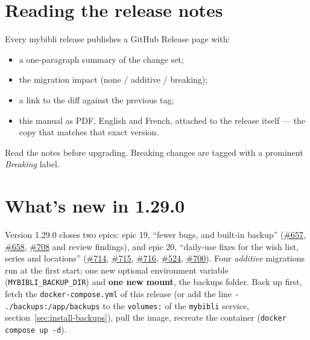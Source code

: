 \section{Reading the release notes}

Every mybibli release publishes a GitHub Release page with:

\begin{itemize}
  \item a one-paragraph summary of the change set;
  \item the migration impact (none / additive / breaking);
  \item a link to the diff against the previous tag;
  \item this manual as PDF, English and French, attached to the
        release itself --- the copy that matches that exact version.
\end{itemize}

Read the notes before upgrading. Breaking changes are tagged with a
prominent \emph{Breaking} label.

\section{What's new in 1.29.0}\label{sec:whats-new-1.29.0}

Version 1.29.0 closes two epics: epic 19, ``fewer bugs, and built-in
backup'' (\href{https://github.com/guycorbaz/mybibli/issues/657}{\#657},
\href{https://github.com/guycorbaz/mybibli/issues/658}{\#658},
\href{https://github.com/guycorbaz/mybibli/issues/708}{\#708} and
review findings), and epic 20, ``daily-use fixes for the wish list, series and locations''
(\href{https://github.com/guycorbaz/mybibli/issues/714}{\#714},
\href{https://github.com/guycorbaz/mybibli/issues/715}{\#715},
\href{https://github.com/guycorbaz/mybibli/issues/716}{\#716},
\href{https://github.com/guycorbaz/mybibli/issues/524}{\#524},
\href{https://github.com/guycorbaz/mybibli/issues/700}{\#700}).
Four \emph{additive} migrations run at the first start; one new
optional environment variable (\texttt{MYBIBLI\_BACKUP\_DIR}) and
\textbf{one new mount}, the backups folder. Back up first, fetch the
\texttt{docker-compose.yml} of this release (or add the line
\texttt{- ./backups:/app/backups} to the \texttt{volumes:} of the
\texttt{mybibli} service, section~\ref{sec:install-backups}), pull the
image, recreate the container (\texttt{docker compose up -d}).

